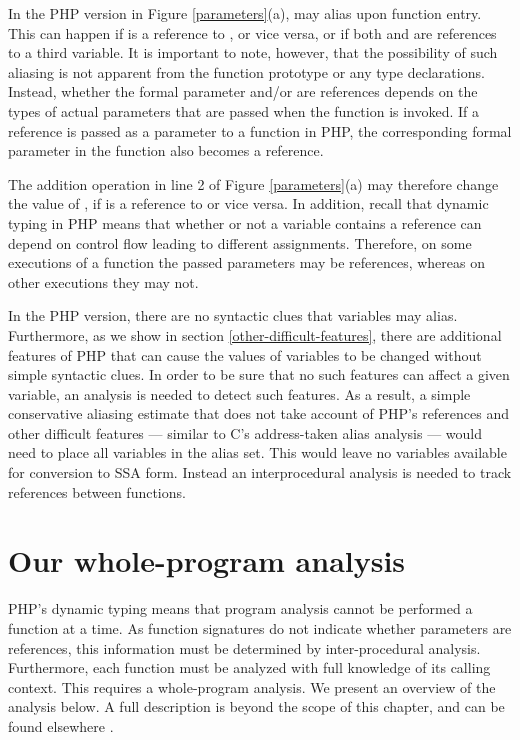In the PHP version in Figure \ref{parameters}(a),  may alias
 upon function entry. This can happen if  is a reference
to , or vice versa, or if both  and  are
references to a third variable. It is important to note, however, that
the possibility of such aliasing is not apparent from the function
prototype or any type declarations. Instead, whether the formal
parameter  and/or  are references depends on the types
of actual parameters that are passed when the function is invoked. If
a reference is passed as a parameter to a function in PHP, the
corresponding formal parameter in the function also becomes a
reference.

The addition operation in line 2 of Figure \ref{parameters}(a) may
therefore change the value of , if  is a reference to
 or vice versa. In addition, recall that dynamic typing in PHP
means that whether or not a variable contains a reference can depend
on control flow leading to different assignments. Therefore, on some
executions of a function the passed parameters may be references,
whereas on other executions they may not.


In the PHP version, there are no syntactic clues that variables may
alias.  Furthermore, as we show in section
\ref{other-difficult-features}, there are additional features of PHP
that can cause the values of variables to be changed without simple
syntactic clues.  In order to be sure that no such features can affect
a given variable, an analysis is needed to detect such features.  As a
result, a simple conservative aliasing estimate that does not take
account of PHP's references and other difficult features --- similar
to C's address-taken alias analysis --- would need to place all
variables in the alias set.  This would leave no variables available
for conversion to SSA form. Instead an interprocedural analysis is
needed to track references between functions.


\section{Our whole-program analysis}

PHP's dynamic typing means that program analysis cannot be performed a
function at a time.  As function signatures do not indicate whether
parameters are references, this information must be determined by
inter-procedural analysis.  Furthermore, each function must be
analyzed with full knowledge of its calling context.  This requires a
whole-program analysis. We present an overview of the analysis below.
A full description is beyond the scope of this chapter, and can be
found elsewhere \cite{Biggar2010}.

